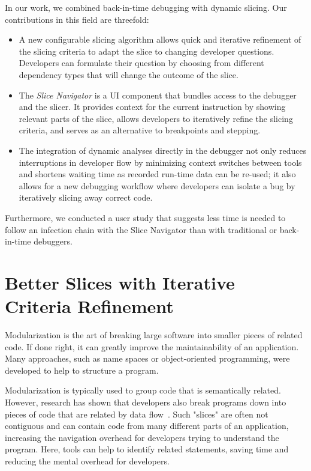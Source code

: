 In our work, we combined back-in-time debugging with dynamic slicing.
Our contributions in this field are threefold:
\begin{itemize}
	\item A new configurable slicing algorithm allows quick and iterative refinement of the slicing criteria to adapt the slice to changing developer questions.
	Developers can formulate their question by choosing from different dependency types that will change the outcome of the slice.
	\item The \emph{Slice Navigator} is a UI component that bundles access to the debugger and the slicer.
		It provides context for the current instruction by showing relevant parts of the slice, allows developers to iteratively refine the slicing criteria, and serves as an alternative to breakpoints and stepping.
	\item The integration of dynamic analyses directly in the debugger not only reduces interruptions in developer flow by minimizing context switches between tools and shortens waiting time as recorded run-time data can be re-used; it also allows for a new debugging workflow where developers can isolate a bug by iteratively slicing away correct code.
\end{itemize}
Furthermore, we conducted a user study that suggests less time is needed to follow an infection chain with the Slice Navigator than with traditional or back-in-time debuggers.

\section{Better Slices with Iterative Criteria Refinement}

Modularization is the art of breaking large software into smaller pieces of related code.
If done right, it can greatly improve the maintainability of an application.
Many approaches, such as name spaces or object-oriented programming, were developed to help to structure a program.

Modularization is typically used to group code that is semantically related.
However, research has shown that developers also break programs down into pieces of code that are related by data flow~\cite{weiser_82_programmers_use_slices_when}.
Such "slices" are often not contiguous and can contain code from many different parts of an application, increasing the navigation overhead for developers trying to understand the program.
Here, tools can help to identify related statements, saving time and reducing the mental overhead for developers.

